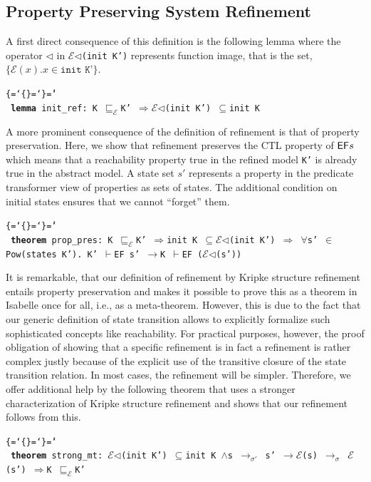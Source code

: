 \documentclass{llncs}
\newenvironment{ttbox}{\begin{alltt}\ttbraces\small\tt}%
                      {\end{alltt}}
\def\ttbraces{\let\.=\nobreak\chardef\{=`\{\chardef\}=`\}\chardef\|=`\\}
\newcommand\ttand{\mbox{{$\land$}}}
\newcommand\ttimp{\mbox{{$\longrightarrow$}}}
\newcommand\ttforall{\mbox{{$\forall$}}}
\newcommand\ttin{\mbox{{$\in$}}}
\newcommand\ttImp{\mbox{{$\Longrightarrow$}}}
\newcommand\ttrel[1]{\mbox{{$\to_{#1}$}}}
\newcommand\ttsubseteq{\mbox{{$\subseteq$}}}
\newcommand\ttvdash{\mbox{{$\vdash$}}}
\newcommand\ttmref[1]{\mbox{{$\sqsubseteq_{#1}$}}}
\newcommand\ttmeref{\ttmref{\mathcal{E}}}
\newcommand\ttecal{\mbox{$\mathcal{E}$}}
\newcommand\ttimg{\mbox{$\triangleleft$}}
\begin{document}
\subsection{Property Preserving System Refinement}
A first direct consequence of this definition is the following lemma
where the operator \texttt{$\ttimg$} in \texttt{\ttecal\ttimg(init K')}
represents function image, that is the set, $\{\ttecal(x). x \in \texttt{init K'}\} $.
\begin{ttbox}
{\bf{lemma}} init_ref: K \ttmeref K' \ttImp \ttecal\ttimg(init K') \ttsubseteq init K
\end{ttbox}
A more prominent consequence of the definition of refinement 
is that of property preservation. Here, we show that refinement preserves the
CTL property of ${\sf EF} s$ which means that a reachability property true in the
refined  model \texttt{K'} %
is already true in the abstract model.
A state set $s'$ represents a property %
in the predicate transformer view of properties as sets of states. 
The additional condition on initial states ensures that we cannot ``forget'' them. 
\begin{ttbox}
{\bf{theorem}} prop_pres: 
   K \ttmeref K'  \ttImp init K \ttsubseteq \ttecal\ttimg(init K') \ttImp
   \ttforall s' \ttin Pow(states K'). K' \ttvdash {\sf EF} s' 
              \ttimp K \ttvdash {\sf EF} (\ttecal\ttimg(s'))
\end{ttbox}
It is remarkable, that our definition of refinement by Kripke 
structure refinement entails property preservation and makes it possible 
to prove this as a theorem in Isabelle once for all, i.e., as a meta-theorem.
However, this is due to the fact that our generic definition of state transition
allows to explicitly formalize such sophisticated concepts like reachability.
For practical purposes, however, the proof obligation of showing that
a specific refinement is in fact a refinement is rather complex
justly because of the explicit use of the transitive closure of the state
transition relation.
In most cases, the refinement will be simpler. Therefore, we offer
additional help by the following theorem that uses a stronger characterization
of Kripke structure refinement and shows that our refinement follows
from this.
\begin{ttbox}
{\bf{theorem}} strong_mt: 
\ttecal\ttimg(init K') \ttsubseteq init K \ttand s \ttrel{\sigma'} s' \ttimp \ttecal(s) \ttrel{\sigma} \ttecal(s') 
\ttImp K \ttmeref K'
\end{ttbox}
\end{document}

